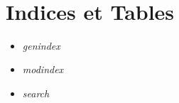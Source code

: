 \documentclass[letterpaper,10pt,english]{sphinxmanual}
\begin{document}
\begin{gather}
\end{gather}

\chapter{Indices et Tables}
\label{index:indices-et-tables}\begin{itemize}
\item {} 
\emph{genindex}

\item {} 
\emph{modindex}

\item {} 
\emph{search}

\end{itemize}



\renewcommand{\indexname}{Index}
\printindex
\end{document}
